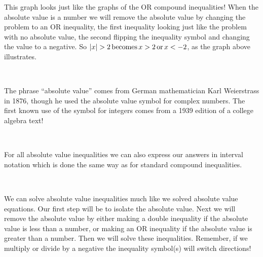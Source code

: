This graph looks just like the graphs of the OR compound inequalities! When
the absolute value is {} a number we will remove the
absolute value by changing the problem to an OR inequality, the first
inequality looking just like the problem with no absolute value, the second
flipping the inequality symbol and changing the value to a negative. So $|x| >
2 \operatorname{becomes} x > 2 \operatorname{or} x < - 2$, as the graph above illustrates.\par
~\par
{} The phrase ``absolute value'' comes from German
mathematician Karl Weierstrass in 1876, though he used the absolute value
symbol for complex numbers. The first known use of the symbol for integers
comes from a 1939 edition of a college algebra text!\par
~\par
For all absolute value inequalities we can also express our answers in
interval notation which is done the same way as for standard compound
inequalities.\par
~\par
We can solve absolute value inequalities much like we solved absolute value
equations. Our first step will be to isolate the absolute value. Next we will
remove the absolute value by either making a double inequality if the absolute
value is less than a number, or making an OR inequality if the absolute value
is greater than a number. Then we will solve these inequalities. Remember, if
we multiply or divide by a negative the inequality symbol(s) will switch
directions!

